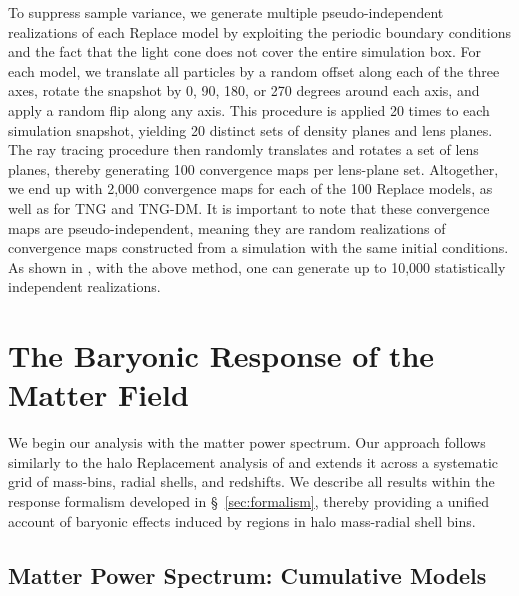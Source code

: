\documentclass[linenumbers,trackchanges]{aastex701}
\begin{document}
To suppress sample variance, we generate multiple pseudo-independent realizations of each Replace model by exploiting the periodic boundary conditions and the fact that the light cone does not cover the entire simulation box. For each model, we translate all particles by a random offset along each of the three axes, rotate the snapshot by 0, 90, 180, or 270 degrees around each axis, and apply a random flip along any axis. This procedure is applied 20 times to each simulation snapshot, yielding 20 distinct sets of density planes and lens planes. The ray tracing procedure then randomly translates and rotates a set of lens planes, thereby generating 100 convergence maps per lens-plane set. Altogether, we end up with 2,000 convergence maps for each of the 100 Replace models, as well as for TNG and TNG-DM. It is important to note that these convergence maps are pseudo-independent, meaning they are random realizations of convergence maps constructed from a simulation with the same initial conditions. As shown in \citet{Petri16}, with the above method, one can generate up to 10,000 statistically independent realizations.

\section{The Baryonic Response of the Matter Field}
\label{sec:results_matter}

We begin our analysis with the matter power spectrum. Our approach follows similarly to the halo Replacement analysis of \citet{Miller-25} and extends it across a systematic grid of mass-bins, radial shells, and redshifts. We describe all results within the response formalism developed in \S~\ref{sec:formalism}, thereby providing a unified account of baryonic effects induced by regions in halo mass-radial shell bins.

\subsection{Matter Power Spectrum: Cumulative Models}
\end{document}

